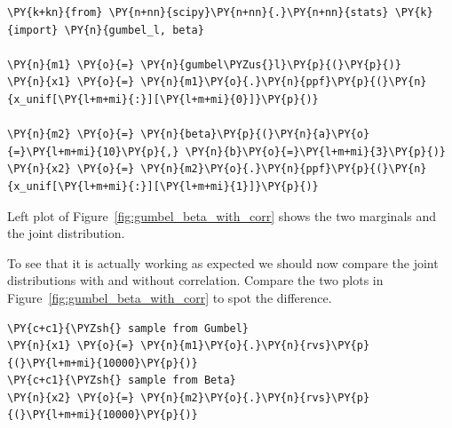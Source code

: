 \begin{tcolorbox}[breakable, size=fbox, boxrule=1pt, pad at break*=1mm,colback=cellbackground, colframe=cellborder]
\begin{Verbatim}[commandchars=\\\{\}]
\PY{k+kn}{from} \PY{n+nn}{scipy}\PY{n+nn}{.}\PY{n+nn}{stats} \PY{k}{import} \PY{n}{gumbel_l, beta}

\PY{n}{m1} \PY{o}{=} \PY{n}{gumbel\PYZus{}l}\PY{p}{(}\PY{p}{)}
\PY{n}{x1} \PY{o}{=} \PY{n}{m1}\PY{o}{.}\PY{n}{ppf}\PY{p}{(}\PY{n}{x_unif[\PY{l+m+mi}{:}][\PY{l+m+mi}{0}]}\PY{p}{)}

\PY{n}{m2} \PY{o}{=} \PY{n}{beta}\PY{p}{(}\PY{n}{a}\PY{o}{=}\PY{l+m+mi}{10}\PY{p}{,} \PY{n}{b}\PY{o}{=}\PY{l+m+mi}{3}\PY{p}{)}
\PY{n}{x2} \PY{o}{=} \PY{n}{m2}\PY{o}{.}\PY{n}{ppf}\PY{p}{(}\PY{n}{x_unif[\PY{l+m+mi}{:}][\PY{l+m+mi}{1}]}\PY{p}{)}
\end{Verbatim}
\end{tcolorbox}

Left plot of Figure~\ref{fig:gumbel_beta_with_corr} shows the two marginals and the joint distribution.
    
To see that it is actually working as expected we should now compare the joint
distributions with and without correlation. 
Compare the two plots in Figure~\ref{fig:gumbel_beta_with_corr} to spot the difference.

\begin{tcolorbox}[breakable, size=fbox, boxrule=1pt, pad at break*=1mm,colback=cellbackground, colframe=cellborder]
\begin{Verbatim}[commandchars=\\\{\}]
\PY{c+c1}{\PYZsh{} sample from Gumbel}
\PY{n}{x1} \PY{o}{=} \PY{n}{m1}\PY{o}{.}\PY{n}{rvs}\PY{p}{(}\PY{l+m+mi}{10000}\PY{p}{)}
\PY{c+c1}{\PYZsh{} sample from Beta}
\PY{n}{x2} \PY{o}{=} \PY{n}{m2}\PY{o}{.}\PY{n}{rvs}\PY{p}{(}\PY{l+m+mi}{10000}\PY{p}{)}
\end{Verbatim}
\end{tcolorbox}

